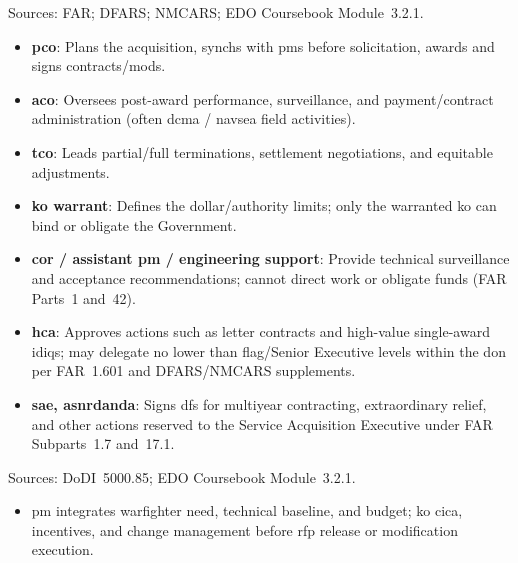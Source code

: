 \documentclass[../main.tex]{subfiles}
\begin{document}
\begin{description}[style=nextline, labelsep=0.5em, font=\bfseries]
	\item[\textbf{Contracting authority (\ac{ko} family).}]
	Sources: FAR; DFARS; NMCARS; EDO Coursebook Module~3.2.1.
      \begin{itemize}
        \item \textbf{\ac{pco}}: Plans the acquisition, synchs with \acp{pm} before solicitation, awards and signs contracts/mods.
        \item \textbf{\ac{aco}}: Oversees post-award performance, surveillance, and payment/contract administration (often \ac{dcma} / \ac{navsea} field activities).
        \item \textbf{\ac{tco}}: Leads partial/full terminations, settlement negotiations, and equitable adjustments.
        \item \textbf{\ac{ko} warrant}: Defines the dollar/authority limits; only the warranted \ac{ko} can bind or obligate the Government.
        \item \textbf{\ac{cor} / assistant \ac{pm} / engineering support}: Provide technical surveillance and acceptance recommendations; cannot direct work or obligate funds (FAR Parts~1 and~42).
        \item \textbf{\ac{hca}}: Approves actions such as letter contracts and high-value single-award \acp{idiq}; may delegate no lower than flag/Senior Executive levels within the \ac{don} per FAR~1.601 and DFARS/NMCARS supplements.
        \item \textbf{\ac{sae}, \ac{asnrdanda}}: Signs \acp{df} for multiyear contracting, extraordinary relief, and other actions reserved to the Service Acquisition Executive under FAR Subparts~1.7 and~17.1.
      \end{itemize}

	\item[\textbf{Program Manager / \ac{ko} partnership.}]
	Sources: DoDI~5000.85; EDO Coursebook Module~3.2.1.
      \begin{itemize}
        \item \ac{pm} integrates warfighter need, technical baseline, and budget; \ac{ko} \ac{cica}, incentives, and change management before \ac{rfp} release or modification execution.
      \end{itemize}


\end{description}
\end{document}
